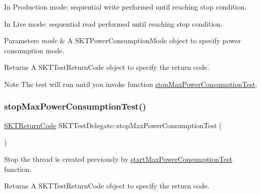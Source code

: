 \begin{DoxyItemize}
\item In Production mode\+: sequential write performed until reaching stop condition.
\item In Live mode\+: sequential read performed until reaching stop condition.
\end{DoxyItemize}


\begin{DoxyParams}{Parameters}
{\em mode} & A S\+K\+T\+Power\+Consumption\+Mode object to specify power consumption mode.\\
\hline
\end{DoxyParams}
\begin{DoxyReturn}{Returns}
A S\+K\+T\+Test\+Return\+Code object to specify the return code.
\end{DoxyReturn}
\begin{DoxyNote}{Note}
The test will run until you invoke function \mbox{\hyperlink{class_s_k_t_test_delegate_a022692ef371a3aa9a24e19b5a5e129c7}{stop\+Max\+Power\+Consumption\+Test}}. 
\end{DoxyNote}
\mbox{\label{class_s_k_t_test_delegate_a022692ef371a3aa9a24e19b5a5e129c7}} 
\subsubsection{\texorpdfstring{stopMaxPowerConsumptionTest()}{stopMaxPowerConsumptionTest()}}
{\footnotesize\ttfamily \mbox{\hyperlink{_storage_kit_test_delegate_8h_a143844aea21c1ac420c1d0307a69deb7}{S\+K\+T\+Return\+Code}} S\+K\+T\+Test\+Delegate\+::stop\+Max\+Power\+Consumption\+Test (\begin{DoxyParamCaption}{ }\end{DoxyParamCaption})}



Stop the thread is created previously by \mbox{\hyperlink{class_s_k_t_test_delegate_a0db3d4f4d578063fdd4f76878a380c29}{start\+Max\+Power\+Consumption\+Test}} function. 

\begin{DoxyReturn}{Returns}
A S\+K\+T\+Test\+Return\+Code object to specify the return code. 
\end{DoxyReturn}
\mbox{\label{class_s_k_t_test_delegate_a370b8ca0f86a90bc36101fd701b82609}} 
